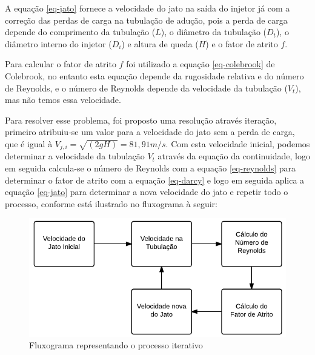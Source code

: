     A equação \eqref{eq-jato} fornece a velocidade do jato na saída do injetor já com a correção das perdas de carga na tubulação de adução, pois a perda de carga depende do comprimento da tubulação ($L$), o diâmetro da tubulação ($D_t$), o diâmetro interno do injetor ($D_i$) e altura de queda ($H$) e o fator de atrito $f$.

    Para calcular o fator de atrito $f$ foi utilizado a equação \eqref{eq-colebrook} de Colebrook, no entanto esta equação depende da rugosidade relativa e do número de Reynolds, e o número de Reynolds depende da velocidade da tubulação ($V_t$), mas não temos essa velocidade.

    Para resolver esse problema, foi proposto uma resolução através iteração, primeiro atribuiu-se um valor para a velocidade do jato sem a perda de carga, que é igual à $V_{j,i} = \sqrt{(2gH)} = 81,91 m/s$. Com esta velocidade inicial, podemos determinar a velocidade da tubulação $V_t$ através da equação da continuidade, logo em seguida calcula-se o número de Reynolds com a equação \eqref{eq-reynolds} para determinar o fator de atrito com a equação \eqref{eq-darcy} e logo em seguida aplica a equação \eqref{eq-jato} para determinar a nova velocidade do jato e repetir todo o processo, conforme está ilustrado no fluxograma à seguir:

    \begin{figure}[htb]
        \centering
        \caption{\label{fig-fluxo} Fluxograma representando o processo iterativo}
        \includegraphics[scale=1]{images/fluxograma.pdf}
    \end{figure}



